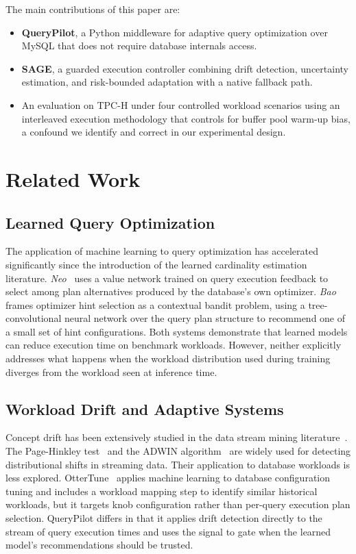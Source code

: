 \documentclass[conference]{IEEEtran}
\begin{document}
The main contributions of this paper are:
\begin{itemize}
    \item \textbf{QueryPilot}, a Python middleware for adaptive query
    optimization over MySQL that does not require database internals access.
    \item \textbf{SAGE}, a guarded execution controller combining drift
    detection, uncertainty estimation, and risk-bounded adaptation with a
    native fallback path.
    \item An evaluation on TPC-H under four controlled workload scenarios
    using an interleaved execution methodology that controls for buffer pool
    warm-up bias, a confound we identify and correct in our experimental design.
\end{itemize}

\section{Related Work}

\subsection*{Learned Query Optimization}
The application of machine learning to query optimization has accelerated
significantly since the introduction of the learned cardinality estimation
literature. \textit{Neo}~\cite{b2} uses a value network trained on query
execution feedback to select among plan alternatives produced by the database's
own optimizer. \textit{Bao}~\cite{b3} frames optimizer hint selection as a
contextual bandit problem, using a tree-convolutional neural network over
the query plan structure to recommend one of a small set of hint
configurations. Both systems demonstrate that learned models can reduce
execution time on benchmark workloads. However, neither explicitly addresses
what happens when the workload distribution used during training diverges from
the workload seen at inference time.

\subsection*{Workload Drift and Adaptive Systems}
Concept drift has been extensively studied in the data stream mining
literature~\cite{b5,b6}. The Page-Hinkley test~\cite{b7} and the ADWIN
algorithm~\cite{b6} are widely used for detecting distributional shifts in
streaming data. Their application to database workloads is less explored.
OtterTune~\cite{b4} applies machine learning to database configuration tuning
and includes a workload mapping step to identify similar historical workloads,
but it targets knob configuration rather than per-query execution plan
selection. QueryPilot differs in that it applies drift detection directly to
the stream of query execution times and uses the signal to gate when the
learned model's recommendations should be trusted.
\end{document}
